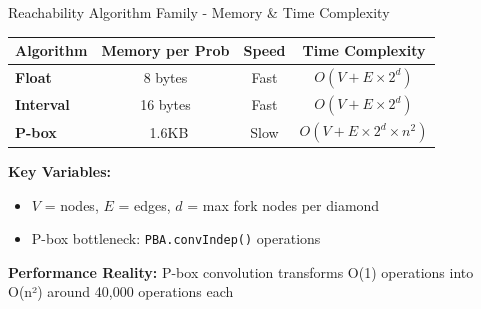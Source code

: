\documentclass[aspectratio=169]{beamer}
\begin{document}
\begin{frame}{\textcolor{juliapurple}{Reachability Algorithm Family - Memory \& Time Complexity}}
\begin{center}
\begin{tabular}{|l|c|c|c|}
\hline
\textbf{Algorithm} & \textbf{Memory per Prob} & \textbf{Speed} & \textbf{Time Complexity} \\
\hline
\textcolor{juliagreen}{\textbf{Float}} & 8 bytes & Fast & $O(V + E \times 2^d)$ \\
\hline
\textcolor{juliablue}{\textbf{Interval}} & 16 bytes &  Fast & $O(V + E \times 2^d)$ \\
\hline
\textcolor{juliared}{\textbf{P-box}} & ~1.6KB &  Slow & $O(V + E \times 2^d \times n^2)$ \\
\hline
\end{tabular}
\end{center}

\vspace{0.4cm}
\textbf{Key Variables:}
\begin{itemize}
    \item $V$ = nodes, $E$ = edges, $d$ = max fork nodes per diamond
    \item P-box bottleneck: \texttt{PBA.convIndep()} operations
\end{itemize}

\vspace{0.3cm}
\begin{center}
\textbf{\textcolor{juliablue}{Performance Reality:}} P-box convolution transforms O(1) operations into O(n²) around 40,000 operations each
\end{center}
\end{frame}
\end{document}
